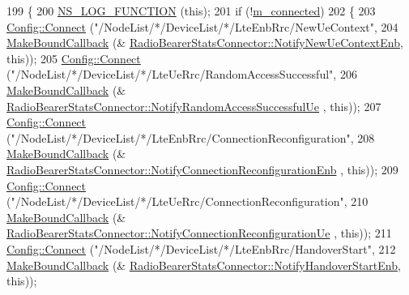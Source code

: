 \begin{DoxyCode}
199 \{
200   \hyperlink{log-macros-disabled_8h_a90b90d5bad1f39cb1b64923ea94c0761}{NS\_LOG\_FUNCTION} (\textcolor{keyword}{this});
201   \textcolor{keywordflow}{if} (!\hyperlink{classns3_1_1RadioBearerStatsConnector_ad8b0778133817a28e6cb1b81397b9f57}{m\_connected})
202     \{
203       \hyperlink{group__config_ga4014f151241cd0939b6cb64409605736}{Config::Connect} (\textcolor{stringliteral}{"/NodeList/*/DeviceList/*/LteEnbRrc/NewUeContext"},
204                        \hyperlink{group__makeboundcallback_ga1725d6362e6065faa0709f7c93f8d770}{MakeBoundCallback} (&
      \hyperlink{classns3_1_1RadioBearerStatsConnector_a78cb88c11eff737f35c1ea9cd42d75a2}{RadioBearerStatsConnector::NotifyNewUeContextEnb}, \textcolor{keyword}{this}));
205       \hyperlink{group__config_ga4014f151241cd0939b6cb64409605736}{Config::Connect} (\textcolor{stringliteral}{"/NodeList/*/DeviceList/*/LteUeRrc/RandomAccessSuccessful"},
206                        \hyperlink{group__makeboundcallback_ga1725d6362e6065faa0709f7c93f8d770}{MakeBoundCallback} (&
      \hyperlink{classns3_1_1RadioBearerStatsConnector_a2bd1e59ad20e4959925ee606ac324a42}{RadioBearerStatsConnector::NotifyRandomAccessSuccessfulUe}
      , \textcolor{keyword}{this}));
207       \hyperlink{group__config_ga4014f151241cd0939b6cb64409605736}{Config::Connect} (\textcolor{stringliteral}{"/NodeList/*/DeviceList/*/LteEnbRrc/ConnectionReconfiguration"},
208                        \hyperlink{group__makeboundcallback_ga1725d6362e6065faa0709f7c93f8d770}{MakeBoundCallback} (&
      \hyperlink{classns3_1_1RadioBearerStatsConnector_ae0909fe24d58f9ca9c00bd9718a2d49c}{RadioBearerStatsConnector::NotifyConnectionReconfigurationEnb}
      , \textcolor{keyword}{this}));
209       \hyperlink{group__config_ga4014f151241cd0939b6cb64409605736}{Config::Connect} (\textcolor{stringliteral}{"/NodeList/*/DeviceList/*/LteUeRrc/ConnectionReconfiguration"},
210                        \hyperlink{group__makeboundcallback_ga1725d6362e6065faa0709f7c93f8d770}{MakeBoundCallback} (&
      \hyperlink{classns3_1_1RadioBearerStatsConnector_a6323adcb2b6c9b07dd63df66e8992707}{RadioBearerStatsConnector::NotifyConnectionReconfigurationUe}
      , \textcolor{keyword}{this}));
211       \hyperlink{group__config_ga4014f151241cd0939b6cb64409605736}{Config::Connect} (\textcolor{stringliteral}{"/NodeList/*/DeviceList/*/LteEnbRrc/HandoverStart"},
212                        \hyperlink{group__makeboundcallback_ga1725d6362e6065faa0709f7c93f8d770}{MakeBoundCallback} (&
      \hyperlink{classns3_1_1RadioBearerStatsConnector_af6881db8b551a57c2d69f93ed44c3aa7}{RadioBearerStatsConnector::NotifyHandoverStartEnb}, \textcolor{keyword}{this}));

\end{DoxyCode}

